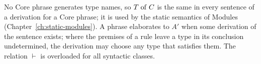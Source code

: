 No Core phrase generates type names, so $T \mathrel{\mathrm{of}} C$ is the same in every sentence
of a derivation for a Core phrase; it is used by the static semantics of
Modules (Chapter~\ref{ch:static-modules}). A phrase elaborates to $A'$ when some
derivation of the sentence exists; where the premises of a rule leave a type in
its conclusion undetermined, the derivation may choose any type that satisfies
them. The relation $\vdash$ is overloaded for all syntactic classes.













